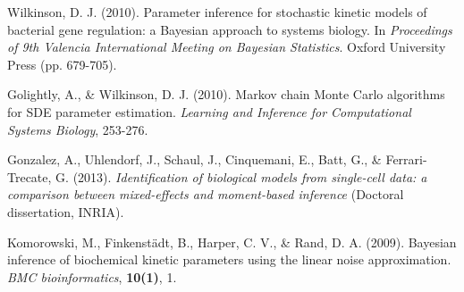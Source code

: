 \documentclass{bioinfo}
\begin{document}
\begin{thebibliography}{}
Wilkinson, D. J. (2010). Parameter inference for stochastic kinetic models of bacterial gene regulation: a Bayesian approach to systems biology. In \textit{Proceedings of 9th Valencia International Meeting on Bayesian Statistics}. Oxford University Press (pp. 679-705).

Golightly, A., \& Wilkinson, D. J. (2010). Markov chain Monte Carlo algorithms for SDE parameter estimation. \textit{Learning and Inference for Computational Systems Biology}, 253-276.

Gonzalez, A., Uhlendorf, J., Schaul, J., Cinquemani, E., Batt, G., \& Ferrari-Trecate, G. (2013). \textit{Identification of biological models from single-cell data: a comparison between mixed-effects and moment-based inference} (Doctoral dissertation, INRIA).

Komorowski, M., Finkenstädt, B., Harper, C. V., \& Rand, D. A. (2009). Bayesian inference of biochemical kinetic parameters using the linear noise approximation. \textit{BMC bioinformatics}, \textbf{10(1)}, 1.

\end{thebibliography}
\end{document}
